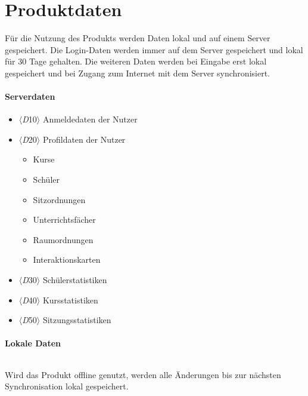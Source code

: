 \section{Produktdaten}
Für die Nutzung des Produkts werden Daten lokal und auf einem \Gls{Server} gespeichert. Die \Gls{Login}-Daten werden immer auf dem \Gls{Server} gespeichert und lokal für 30 Tage gehalten. Die weiteren Daten werden bei Eingabe erst lokal gespeichert und bei Zugang zum Internet mit dem \Gls{Server} synchronisiert.

\paragraph{\Gls{Server}daten}

    \singlespacing
    \begin{itemize}
            \item $\langle$\textit D10$\rangle$ Anmeldedaten der Nutzer
            \item  $\langle$\textit D20$\rangle$ Profildaten der Nutzer
            \begin{itemize}
                \item Kurse
                \item Schüler
                \item Sitzordnungen
                \item Unterrichtsfächer
                \item Raumordnungen
                \item Interaktionskarten
            \end{itemize}
            \item $\langle$\textit D30$\rangle$ Schülerstatistiken
            \item $\langle$\textit D40$\rangle$ Kursstatistiken
           \item $\langle$\textit D50$\rangle$ Sitzungsstatistiken
        \end{itemize}
        \onehalfspacing

\paragraph{Lokale Daten} $~$ 

Wird das Produkt offline genutzt, werden alle Änderungen bis zur nächsten Synchronisation lokal gespeichert.